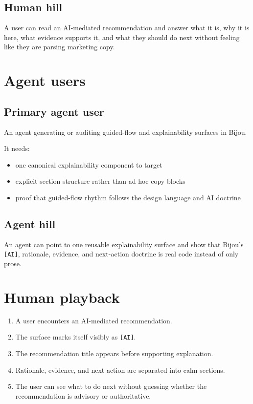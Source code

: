 \subsection{Human hill}\label{record-172-human-hill}

A user can read an AI-mediated recommendation and answer what it is, why it is here, what evidence supports it, and what they should do next without feeling like they are parsing marketing copy.

\section{Agent users}\label{record-172-agent-users}

\subsection{Primary agent user}\label{record-172-primary-agent-user}

An agent generating or auditing guided-flow and explainability surfaces in Bijou.

It needs:

\begin{itemize}
\tightlist
\item
  one canonical explainability component to target
\item
  explicit section structure rather than ad hoc copy blocks
\item
  proof that guided-flow rhythm follows the design language and AI doctrine
\end{itemize}

\subsection{Agent hill}\label{record-172-agent-hill}

An agent can point to one reusable explainability surface and show that Bijou's \texttt{[\allowbreak{}A\allowbreak{}I\allowbreak{}]}, rationale, evidence, and next-action doctrine is real code instead of only prose.

\section{Human playback}\label{record-172-human-playback}

\begin{enumerate}
\def\labelenumi{\arabic{enumi}.}
\tightlist
\item
  A user encounters an AI-mediated recommendation.
\item
  The surface marks itself visibly as \texttt{[\allowbreak{}A\allowbreak{}I\allowbreak{}]}.
\item
  The recommendation title appears before supporting explanation.
\item
  Rationale, evidence, and next action are separated into calm sections.
\item
  The user can see what to do next without guessing whether the recommendation is advisory or authoritative.
\end{enumerate}

